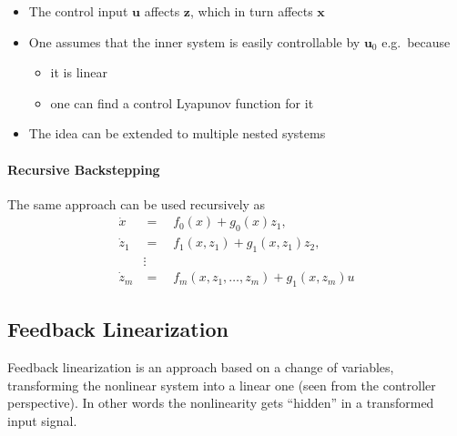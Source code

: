 \newpar{}

\begin{itemize}
    \item The control input $\mathbf{u}$ affects $\mathbf{z}$, which in turn affects $\mathbf{x}$
    \item One assumes that the inner system is easily controllable by $\mathbf{u}_0$ e.g.\ because
          \begin{itemize}
              \item it is linear
              \item one can find a control Lyapunov function for it
          \end{itemize}
    \item The idea can be extended to multiple nested systems
\end{itemize}

\paragraph{Recursive Backstepping}
The same approach can be used recursively as
\begin{align*}
    \dot{x}     & =\quad f_{0}(x)+g_{0}(x)z_{1},                     \\
    \dot{z}_{1} & =\quad f_{1}(x,z_{1})+g_{1}(x,z_{1})z_{2},         \\
                & \vdots                                             \\
    \dot{z}_{m} & =\quad f_{m}(x,z_{1},\ldots,z_{m})+g_{1}(x,z_{m})u
\end{align*}

\subsection{Feedback Linearization}
Feedback linearization is an approach based on a change of variables, transforming the nonlinear system into a linear one (seen from the controller perspective). In other words the nonlinearity gets ``hidden'' in a transformed input signal.

